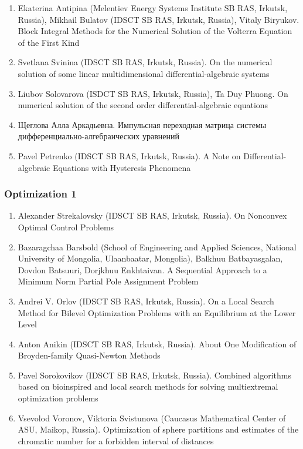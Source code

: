 \documentclass[
]{article}
\providecommand{\tightlist}{%
  \setlength{\itemsep}{0pt}\setlength{\parskip}{0pt}}
\begin{document}
\begin{enumerate}
\def\labelenumi{\arabic{enumi}.}
\tightlist
\item
  Ekaterina Antipina (Melentiev Energy Systems Institute SB RAS,
  Irkutsk, Russia), Mikhail Bulatov (IDSCT SB RAS, Irkutsk, Russia),
  Vitaly Biryukov. Block Integral Methods for the Numerical Solution of
  the Volterra Equation of the First Kind
\item
  Svetlana Svinina (IDSCT SB RAS, Irkutsk, Russia). On the numerical
  solution of some linear multidimensional differential-algebraic
  systems
\item
  Liubov Solovarova (ISDCT SB RAS, Irkutsk, Russia), Ta Duy Phuong. On
  numerical solution of the second order differential-algebraic
  equations
\item
  Щеглова Алла Аркадьевна. Импульсная переходная матрица системы
  дифференциально-алгебраических уравнений
\item
  Pavel Petrenko (IDSCT SB RAS, Irkutsk, Russia). A Note on
  Differential-algebraic Equations with Hysteresis Phenomena
\end{enumerate}

\hypertarget{o1}{%
\subsubsection{Optimization 1}\label{o1}}

\begin{enumerate}
\def\labelenumi{\arabic{enumi}.}
\tightlist
\item
  Alexander Strekalovsky (IDSCT SB RAS, Irkutsk, Russia). On Nonconvex
  Optimal Control Problems
\item
  Bazaragchaa Barsbold (School of Engineering and Applied Sciences,
  National University of Mongolia, Ulaanbaatar, Mongolia), Balkhuu
  Batbayasgalan, Dovdon Batsuuri, Dorjkhuu Enkhtaivan. A Sequential
  Approach to a Minimum Norm Partial Pole Assignment Problem
\item
  Andrei V. Orlov (IDSCT SB RAS, Irkutsk, Russia). On a Local Search
  Method for Bilevel Optimization Problems with an Equilibrium at the
  Lower Level
\item
  Anton Anikin (IDSCT SB RAS, Irkutsk, Russia). About One Modification
  of Broyden-family Quasi-Newton Methods
\item
  Pavel Sorokovikov (IDSCT SB RAS, Irkutsk, Russia). Combined algorithms
  based on bioinspired and local search methods for solving
  multiextremal optimization problems
\item
  Vsevolod Voronov, Viktoria Svistunova (Caucasus Mathematical Center of
  ASU, Maikop, Russia). Optimization of sphere partitions and estimates
  of the chromatic number for a forbidden interval of distances
\end{enumerate}
\end{document}
